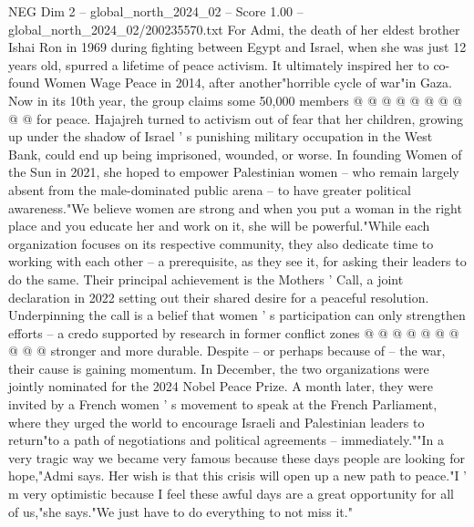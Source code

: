 \begin{textsample}{NEG Dim 2 – global\_north\_2024\_02 – Score 1.00 – global\_north\_2024\_02/200235570.txt}
For Admi, the death of her eldest brother Ishai Ron in 1969 during fighting between Egypt and Israel, when she was just 12 years old, spurred a lifetime of peace activism.
It ultimately inspired her to co-found Women Wage Peace in 2014, after another"horrible cycle of war"in Gaza.
Now in its 10th year, the group claims some 50,000 members @ @ @ @ @ @ @ @ @ @ for peace.
Hajajreh turned to activism out of fear that her children, growing up under the shadow of Israel ' s punishing military occupation in the West Bank, could end up being imprisoned, wounded, or worse.
In founding Women of the Sun in 2021, she hoped to empower Palestinian women -- who remain largely absent from the male-dominated public arena -- to have greater political awareness."We believe women are strong and when you put a woman in the right place and you educate her and work on it, she will be powerful."While each organization focuses on its respective community, they also dedicate time to working with each other -- a prerequisite, as they see it, for asking their leaders to do the same.
Their principal achievement is the Mothers ' Call, a joint declaration in 2022 setting out their shared desire for a peaceful resolution.
Underpinning the call is a belief that women ' s participation can only strengthen efforts -- a credo supported by research in former conflict zones @ @ @ @ @ @ @ @ @ @ stronger and more durable.
Despite -- or perhaps because of -- the war, their cause is gaining momentum.
In December, the two organizations were jointly nominated for the 2024 Nobel Peace Prize.
A month later, they were invited by a French women ' s movement to speak at the French Parliament, where they urged the world to encourage Israeli and Palestinian leaders to return"to a path of negotiations and political agreements -- immediately.""In a very tragic way we became very famous because these days people are looking for hope,"Admi says.
Her wish is that this crisis will open up a new path to peace."I ' m very optimistic because I feel these awful days are a great opportunity for all of us,"she says."We just have to do everything to not miss it."

\end{textsample}
